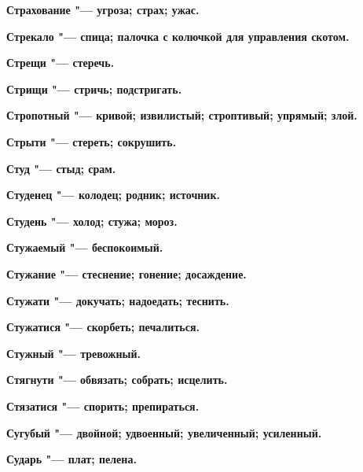 \begin{mymulticols}{2}
\bfseries Страхование\normalfont{} "--- угроза; страх; ужас. 




\bfseries Стрекало\normalfont{} "--- спица; палочка с колючкой для управления скотом. 




\bfseries Стрещи\normalfont{} "--- стеречь. 




\bfseries Стрищи\normalfont{} "--- стричь; подстригать. 




\bfseries Стропотный\normalfont{} "--- кривой; извилистый; строптивый; упрямый; злой. 




\bfseries Стрыти\normalfont{} "--- стереть; сокрушить. 




\bfseries Студ\normalfont{} "--- стыд; срам. 




\bfseries Студенец\normalfont{} "--- колодец; родник; источник. 




\bfseries Студень\normalfont{} "--- холод; стужа; мороз. 




\bfseries Стужаемый\normalfont{} "--- беспокоимый. 




\bfseries Стужание\normalfont{} "--- стеснение; гонение; досаждение. 




\bfseries Стужати\normalfont{} "--- докучать; надоедать; теснить. 




\bfseries Стужатися\normalfont{} "--- скорбеть; печалиться. 




\bfseries Стужный\normalfont{} "--- тревожный. 




\bfseries Стягнути\normalfont{} "--- обвязать; собрать; исцелить. 




\bfseries Стязатися\normalfont{} "--- спорить; препираться. 




\bfseries Сугубый\normalfont{} "--- двойной; удвоенный; увеличенный; усиленный. 




\bfseries Сударь\normalfont{} "--- плат; пелена. 





\end{mymulticols}
